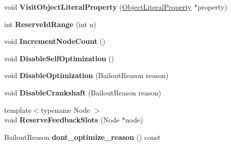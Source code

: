 \begin{DoxyCompactItemize}
\item 
void {\bfseries Visit\+Object\+Literal\+Property} (\hyperlink{classv8_1_1internal_1_1_object_literal_property}{Object\+Literal\+Property} $\ast$property)\hypertarget{classv8_1_1internal_1_1_ast_numbering_visitor_ae0beac08193ae5af961d6677e6dc8d62}{}\label{classv8_1_1internal_1_1_ast_numbering_visitor_ae0beac08193ae5af961d6677e6dc8d62}

\item 
int {\bfseries Reserve\+Id\+Range} (int n)\hypertarget{classv8_1_1internal_1_1_ast_numbering_visitor_a5e4f99d3e20b9a739cb745c51d2d7441}{}\label{classv8_1_1internal_1_1_ast_numbering_visitor_a5e4f99d3e20b9a739cb745c51d2d7441}

\item 
void {\bfseries Increment\+Node\+Count} ()\hypertarget{classv8_1_1internal_1_1_ast_numbering_visitor_afa12ba83b7fc2eb21b7a70718efcc1ee}{}\label{classv8_1_1internal_1_1_ast_numbering_visitor_afa12ba83b7fc2eb21b7a70718efcc1ee}

\item 
void {\bfseries Disable\+Self\+Optimization} ()\hypertarget{classv8_1_1internal_1_1_ast_numbering_visitor_a8961a4dbfdf6de02ffc808cce8ea6d79}{}\label{classv8_1_1internal_1_1_ast_numbering_visitor_a8961a4dbfdf6de02ffc808cce8ea6d79}

\item 
void {\bfseries Disable\+Optimization} (Bailout\+Reason reason)\hypertarget{classv8_1_1internal_1_1_ast_numbering_visitor_a42adf25e4ce919a9917e8f9646b61c70}{}\label{classv8_1_1internal_1_1_ast_numbering_visitor_a42adf25e4ce919a9917e8f9646b61c70}

\item 
void {\bfseries Disable\+Crankshaft} (Bailout\+Reason reason)\hypertarget{classv8_1_1internal_1_1_ast_numbering_visitor_a1298e7a8fba29ead9d414c35df88e5a4}{}\label{classv8_1_1internal_1_1_ast_numbering_visitor_a1298e7a8fba29ead9d414c35df88e5a4}

\item 
{\footnotesize template$<$typename Node $>$ }\\void {\bfseries Reserve\+Feedback\+Slots} (Node $\ast$node)\hypertarget{classv8_1_1internal_1_1_ast_numbering_visitor_aa2580a9e1686e0f8fcc77369dcf7df35}{}\label{classv8_1_1internal_1_1_ast_numbering_visitor_aa2580a9e1686e0f8fcc77369dcf7df35}

\item 
Bailout\+Reason {\bfseries dont\+\_\+optimize\+\_\+reason} () const \hypertarget{classv8_1_1internal_1_1_ast_numbering_visitor_a5a165ad17c819cdb27fccee2fb93bc41}{}\label{classv8_1_1internal_1_1_ast_numbering_visitor_a5a165ad17c819cdb27fccee2fb93bc41}


\end{DoxyCompactItemize}
